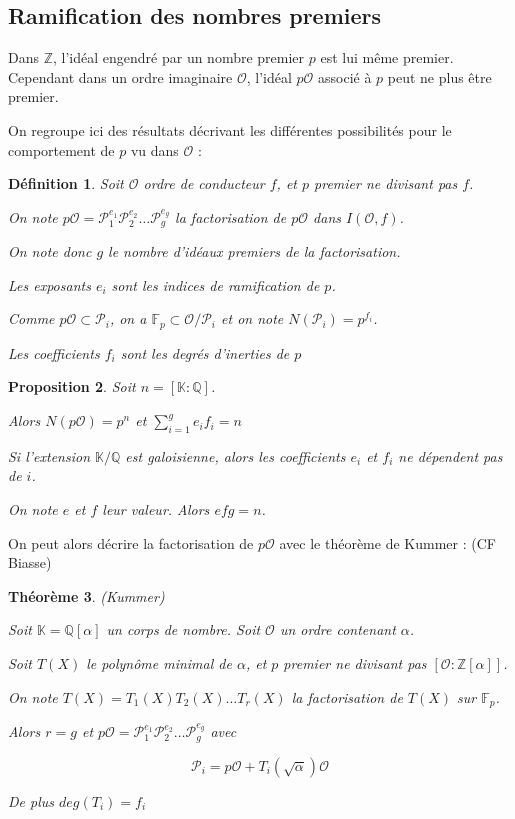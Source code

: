 \documentclass{article}
\newcommand{\Z}[0]{\mathbb{Z}}
\newcommand{\Q}[0]{\mathbb{Q}}
\newcommand{\K}[0]{\mathbb{K}}
\newcommand{\OR}[0]{\mathcal{O}}
\newcommand{\PR}[0]{\mathcal{P}}
\newcommand{\F}[0]{\mathbb{F}}
\newtheorem{The}{Théorème}[section]
\newtheorem{Prop}[The]{Proposition}
\newtheorem{Def}[The]{Définition}
\begin{document}
\subsection{Ramification des nombres premiers}

Dans $\Z$, l'idéal engendré par un nombre premier $p$ est lui même premier. Cependant dans un ordre imaginaire $\OR$, l'idéal $p\OR$ associé à $p$ peut ne plus être premier. 

On regroupe ici des résultats décrivant les différentes possibilités pour le comportement de $p$ vu dans $\OR$ :

\begin{Def}
	Soit $\OR$ ordre de conducteur $f$, et $p$ premier ne divisant pas $f$.
	
	On note $p\OR = \PR_{1}^{e_{1}}\PR_{2}^{e_{2}}\ldots\PR_{g}^{e_{g}}$ la factorisation de $p\OR$ dans $I(\OR,f)$. 
	
	On note donc $g$ le nombre d'idéaux premiers de la factorisation.
	
	Les exposants $e_{i}$ sont les indices de ramification de $p$.
	
	Comme $p\OR\subset\PR_{i}$, on a $\F_{p}\subset\OR/\PR_{i}$ et on note $N(\PR_{i}) = p^{f_{i}}$. 
	
	Les coefficients $f_{i}$ sont les degrés d'inerties de $p$
\end{Def}



\begin{Prop}
	
	Soit $n = \left[ \K : \Q\right] $. 
	
	Alors $N(p\OR) = p^{n}$ et $\sum_{i = 1}^{g}e_{i}f_{i} = n$
	
	Si l'extension $\K/\Q$ est galoisienne, alors les coefficients $e_{i}$ et $f_{i}$ ne dépendent pas de $i$. 
	
	On note $e$ et $f$ leur valeur. Alors $efg = n$.
\end{Prop}

On peut alors décrire la factorisation de $p\OR$ avec le théorème de Kummer : (CF Biasse)

\begin{The}(Kummer)
	
	Soit $\K = \Q[\alpha]$ un corps de nombre. Soit $\OR$ un ordre contenant $\alpha$. 
	
	Soit $T(X)$ le polynôme minimal de $\alpha$, et $p$ premier ne divisant pas $\left[ \OR : \Z\left[ \alpha\right] \right] $.
	
	On note $T(X) = T_{1}(X)T_{2}(X)\ldots T_{r}(X)$ la factorisation  de $T(X)$ sur $\F_{p}$.
	
	Alors $r = g$ et $p\OR = \PR_{1}^{e_{1}}\PR_{2}^{e_{2}}\ldots\PR_{g}^{e_{g}}$ avec
	
	\begin{equation*}
		\PR_{i} = p\OR + T_{i}(\sqrt{\alpha})\OR 
	\end{equation*}
	
	De plus $deg(T_{i}) = f_{i}$
	
\end{The}
\end{document}

